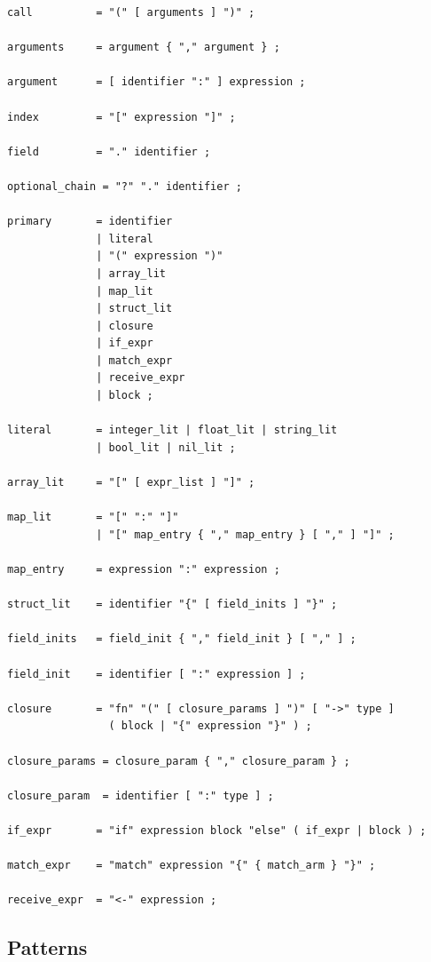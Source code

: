 \begin{lstlisting}[language=EBNF]
call          = "(" [ arguments ] ")" ;

arguments     = argument { "," argument } ;

argument      = [ identifier ":" ] expression ;

index         = "[" expression "]" ;

field         = "." identifier ;

optional_chain = "?" "." identifier ;

primary       = identifier
              | literal
              | "(" expression ")"
              | array_lit
              | map_lit
              | struct_lit
              | closure
              | if_expr
              | match_expr
              | receive_expr
              | block ;

literal       = integer_lit | float_lit | string_lit
              | bool_lit | nil_lit ;

array_lit     = "[" [ expr_list ] "]" ;

map_lit       = "[" ":" "]"
              | "[" map_entry { "," map_entry } [ "," ] "]" ;

map_entry     = expression ":" expression ;

struct_lit    = identifier "{" [ field_inits ] "}" ;

field_inits   = field_init { "," field_init } [ "," ] ;

field_init    = identifier [ ":" expression ] ;

closure       = "fn" "(" [ closure_params ] ")" [ "->" type ]
                ( block | "{" expression "}" ) ;

closure_params = closure_param { "," closure_param } ;

closure_param  = identifier [ ":" type ] ;

if_expr       = "if" expression block "else" ( if_expr | block ) ;

match_expr    = "match" expression "{" { match_arm } "}" ;

receive_expr  = "<-" expression ;
\end{lstlisting}

\subsection{Patterns}

